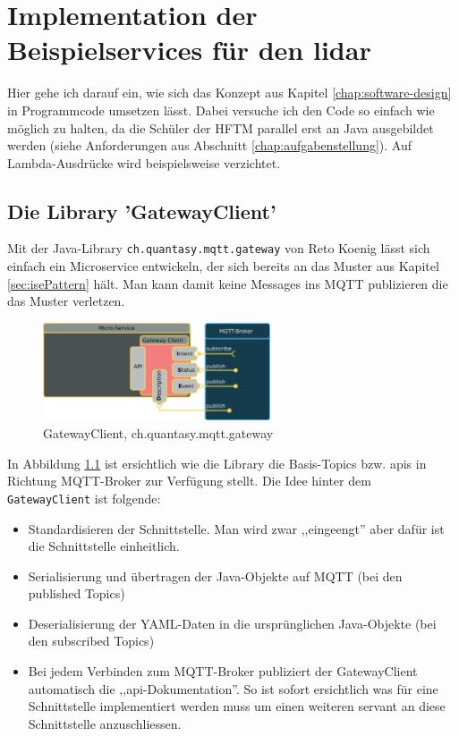 \chapter{Implementation der Beispielservices für den \acrshort{lidar}}
Hier gehe ich darauf ein, wie sich das Konzept aus Kapitel \ref{chap:software-design} in Programmcode umsetzen lässt. Dabei versuche ich den Code so einfach wie möglich zu halten, da die Schüler der HFTM parallel erst an Java ausgebildet werden (siehe Anforderungen aus Abschnitt \ref{chap:aufgabenstellung}). Auf Lambda-Ausdrücke wird beispielsweise verzichtet.
\label{chap:beispielimplementation}
\section{Die Library 'GatewayClient'}
Mit der  Java-Library \verb|ch.quantasy.mqtt.gateway| von Reto Koenig\cite{ch.quantasy.mqtt.gateway} lässt sich einfach ein Microservice entwickeln, der sich bereits an das Muster aus Kapitel \ref{sec:isePattern} hält. Man kann damit keine Messages ins MQTT publizieren die das Muster verletzen. 
\begin{figure}[H]
	\centering
	\includegraphics[width=0.6\textwidth]{img/gatewayclient.png}
	\caption{GatewayClient, ch.quantasy.mqtt.gateway\cite{ch.quantasy.mqtt.gateway}}
	\label{fig:gatewayclient}
\end{figure}
In Abbildung \ref{fig:gatewayclient} ist ersichtlich wie die Library die Basis-Topics bzw. \acrshort{api}s in Richtung MQTT-Broker zur Verfügung stellt. Die Idee hinter dem \verb|GatewayClient| ist folgende:
\begin{itemize}
	\item
	Standardisieren der Schnittstelle. Man wird zwar ,,eingeengt'' aber dafür ist die Schnittstelle einheitlich.
	\item
	Serialisierung und übertragen der Java-Objekte auf MQTT (bei den published Topics)
	\item
	Deserialisierung der YAML-Daten in die ursprünglichen Java-Objekte (bei den subscribed Topics)
	\item
	Bei jedem Verbinden zum MQTT-Broker publiziert der GatewayClient automatisch die ,,\acrshort{api}-Dokumentation''. So ist sofort ersichtlich was für eine Schnittstelle implementiert werden muss um einen weiteren \Gls{servant} an diese Schnittstelle anzuschliessen.
\end{itemize}
